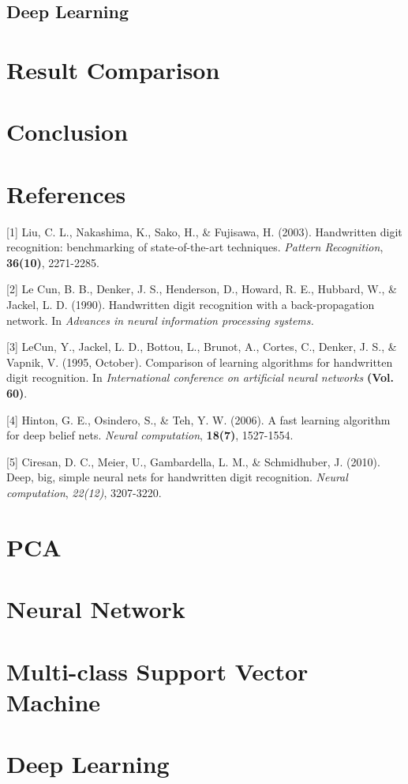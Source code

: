 \documentclass{article} %
\begin{document}

\subsection{Deep Learning}


\section{Result Comparison} \label{Comparison}

\section{Conclusion} \label{Conclu}

\section{References}

\small{
[1] Liu, C. L., Nakashima, K., Sako, H., \& Fujisawa, H. (2003). Handwritten
digit recognition: benchmarking of state-of-the-art techniques. {\it Pattern
    Recognition}, {\bf 36(10)}, 2271-2285.

[2] Le Cun, B. B., Denker, J. S., Henderson, D., Howard, R. E., Hubbard, W., \&
Jackel, L. D. (1990). Handwritten digit recognition with a back-propagation
network. In {\it Advances in neural information processing systems.}

[3] LeCun, Y., Jackel, L. D., Bottou, L., Brunot, A., Cortes, C., Denker, J.
S., \& Vapnik, V. (1995, October). Comparison of learning algorithms for
handwritten digit recognition. In {\it International conference on artificial
    neural networks} {\bf (Vol. 60)}.

[4] Hinton, G. E., Osindero, S., \& Teh, Y. W. (2006). A fast learning
algorithm for deep belief nets. {\it Neural computation}, {\bf 18(7)}, 1527-1554.

[5] Ciresan, D. C., Meier, U., Gambardella, L. M., \& Schmidhuber, J. (2010).
Deep, big, simple neural nets for handwritten digit recognition. {\it Neural
    computation}, {\it 22(12)}, 3207-3220.
}

\newpage
\appendix
\section{PCA}
\section{Neural Network}
\section{Multi-class Support Vector Machine}
\section{Deep Learning}
\end{document}
